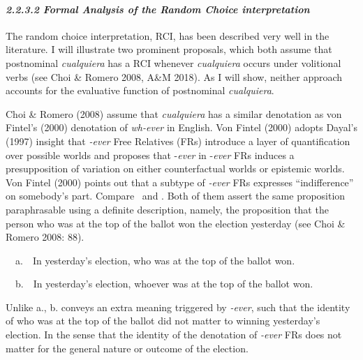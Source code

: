 \paragraph[2.2.3.2 Formal Analysis of the Random Choice interpretation]{\textit{2.2.3.2 Formal Analysis of the Random Choice interpretation}}
\begin{styleStandard}
The random choice interpretation, RCI, has been described very well in the literature. I will illustrate two prominent proposals, which both assume that postnominal \textit{cualquiera} has a RCI whenever \textit{cualquiera} occurs under volitional verbs (see Choi \& Romero 2008, A\&M 2018). As I will show, neither approach accounts for the evaluative function of postnominal \textit{cualquiera}.
\end{styleStandard}

\begin{styleStandard}
Choi \& Romero (2008) assume that \textit{cualquiera} has a similar denotation as von Fintel’s (2000) denotation of \textit{wh-ever} in English. Von Fintel (2000) adopts Dayal’s (1997) insight that \textit{\nobreakdash-ever} Free Relatives (FRs) introduce a layer of quantification over possible worlds and proposes that \nobreakdash-\textit{ever} in \nobreakdash-\textit{ever} FRs induces a presupposition of variation on either counterfactual worlds or epistemic worlds. Von Fintel (2000) points out that a subtype of \textit{\nobreakdash-ever} FRs expresses “indifference” on somebody’s part. Compare \ and . Both of them assert the same proposition paraphrasable using a definite description, namely, the proposition that the person who was at the top of the ballot won the election yesterday (see Choi \& Romero 2008: 88).
\end{styleStandard}

\begin{styleStandard}
\label{bkm:Ref533762240}\ \ a.\ \ In yesterday’s election, who was at the top of the ballot won.
\end{styleStandard}

\begin{styleStandard}
\ \ b.\ \ In yesterday’s election, whoever was at the top of the ballot won.
\end{styleStandard}

\begin{styleStandard}
Unlike a., b. conveys an extra meaning triggered by \textit{\nobreakdash-ever}, such that the identity of who was at the top of the ballot did not matter to winning yesterday’s election. In the sense that the identity of the denotation of \textit{\nobreakdash-ever} FRs does not matter for the general nature or outcome of the election.
\end{styleStandard}

